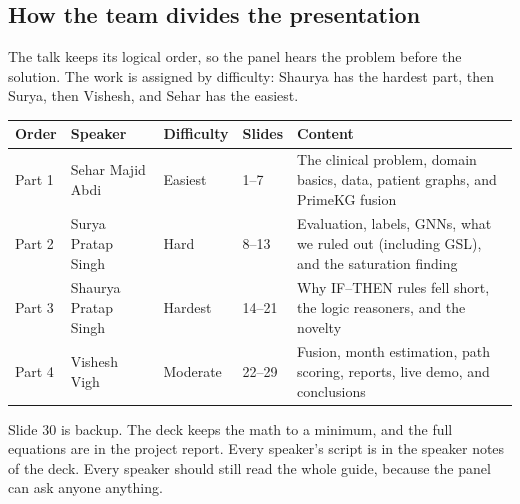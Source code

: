 \documentclass[11pt,a4paper]{article}
\begin{document}
\subsection{How the team divides the presentation}
The talk keeps its logical order, so the panel hears the problem before the solution. The work is assigned by difficulty: Shaurya has the hardest part, then Surya, then Vishesh, and Sehar has the easiest.
\begin{center}
\begin{tabular}{p{1.0cm}p{3.6cm}p{1.6cm}p{1.2cm}p{5.6cm}}
\toprule
Order & Speaker & Difficulty & Slides & Content \\
\midrule
Part 1 & Sehar Majid Abdi & Easiest & 1--7 & The clinical problem, domain basics, data, patient graphs, and PrimeKG fusion \\
Part 2 & Surya Pratap Singh & Hard & 8--13 & Evaluation, labels, GNNs, what we ruled out (including GSL), and the saturation finding \\
Part 3 & Shaurya Pratap Singh & Hardest & 14--21 & Why IF--THEN rules fell short, the logic reasoners, and the novelty \\
Part 4 & Vishesh Vigh & Moderate & 22--29 & Fusion, month estimation, path scoring, reports, live demo, and conclusions \\
\bottomrule
\end{tabular}
\end{center}
Slide 30 is backup. The deck keeps the math to a minimum, and the full equations are in the project report. Every speaker's script is in the speaker notes of the deck. Every speaker should still read the whole guide, because the panel can ask anyone anything.
\end{document}
